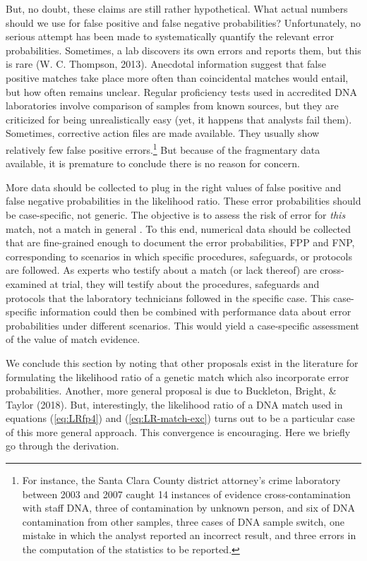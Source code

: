\documentclass[
  10pt,
  dvipsnames,enabledeprecatedfontcommands]{scrartcl}
\begin{document}
But, no doubt, these claims are still rather hypothetical. What actual
numbers should we use for false positive and false negative
probabilities? Unfortunately, no serious attempt has been made to
systematically quantify the relevant error probabilities. Sometimes, a
lab discovers its own errors and reports them, but this is rare (W. C.
Thompson, 2013). Anecdotal information suggest that false positive
matches take place more often than coincidental matches would entail,
but how often remains unclear. Regular proficiency tests used in
accredited DNA laboratories involve comparison of samples from known
sources, but they are criticized for being unrealistically easy (yet, it
happens that analysts fail them). Sometimes, corrective action files are
made available. They usually show relatively few false positive
errors.\footnote{For instance, the Santa Clara County district
  attorney's crime laboratory between 2003 and 2007 caught 14 instances
  of evidence cross-contamination with staff DNA, three of contamination
  by unknown person, and six of DNA contamination from other samples,
  three cases of DNA sample switch, one mistake in which the analyst
  reported an incorrect result, and three errors in the computation of
  the statistics to be reported.} But because of the fragmentary data
available, it is premature to conclude there is no reason for concern.

More data should be collected to plug in the right values of false
positive and false negative probabilities in the likelihood ratio. These
error probabilities should be case-specific, not generic. The objective
is to assess the risk of error for \textit{this} match, not a match in
general . To this end, numerical data should be
collected that are fine-grained enough to document the error
probabilities, FPP and FNP, corresponding to scenarios in which specific
procedures, safeguards, or protocols are followed. As experts who
testify about a match (or lack thereof) are cross-examined at trial,
they will testify about the procedures, safeguards and protocols that
the laboratory technicians followed in the specific case. This
case-specific information could then be combined with performance data
about error probabilities under different scenarios. This would yield a
case-specific assessment of the value of match evidence.

We conclude this section by noting that other proposals exist in the
literature for formulating the likelihood ratio of a genetic match which
also incorporate error probabilities. Another, more general proposal is
due to Buckleton, Bright, \& Taylor (2018). But, interestingly, the
likelihood ratio of a DNA match used in equations (\ref{eq:LRfp4}) and
(\ref{eq:LR-match-exc}) turns out to be a particular case of this more
general approach. This convergence is encouraging. Here we briefly go
through the derivation.
\end{document}
